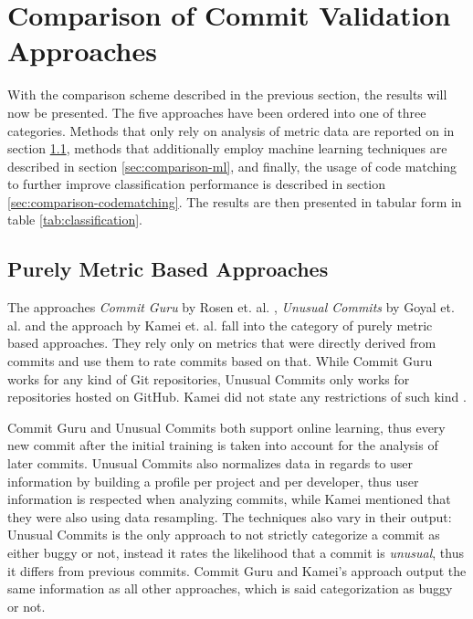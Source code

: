 \section{Comparison of Commit Validation Approaches}
\label{sec:comparison}

With the comparison scheme described in the previous section,
the results will now be presented. 
The five approaches have been ordered into one of three categories. Methods that only rely on analysis of metric data are reported on in section \ref{sec:comparison-metricbased}, methods that additionally employ machine learning techniques are described in section \ref{sec:comparison-ml}, and finally, the usage of code matching to further improve classification performance is described in section \ref{sec:comparison-codematching}.
The results are then presented in tabular form in table \ref{tab:classification}.

\subsection{Purely Metric Based Approaches}
\label{sec:comparison-metricbased}

The approaches \textit{Commit Guru} by Rosen et. al. \cite{Rosen2015}, \textit{Unusual Commits} by Goyal et. al. \cite{Goyal2017} and the approach by Kamei et. al. \cite{Kamei2013} fall into the category of purely metric based approaches. They rely only on metrics that were directly derived from commits and use them to rate commits based on that. While Commit Guru works for any kind of Git repositories, Unusual Commits only works for repositories hosted on GitHub. Kamei did not state any restrictions of such kind \cite{Kamei2013}.

Commit Guru and Unusual Commits both support online learning, thus every new commit after the initial training is taken into account for the analysis of later commits.
Unusual Commits also normalizes data in regards to user information by building a profile per project and per developer, thus user information is respected when analyzing commits, 
while Kamei mentioned that they were also using data resampling.
The techniques also vary in their output: Unusual Commits is the only approach to not strictly categorize a commit as either buggy or not, instead it rates the likelihood that a commit is \textit{unusual}, thus it differs from previous commits. Commit Guru and Kamei's approach output the same information as all other approaches, which is said categorization as buggy or not.

